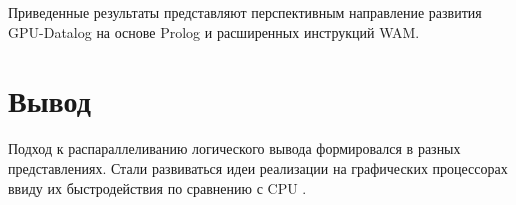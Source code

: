 \begin{figure}[H]
\end{figure} 

Приведенные результаты представляют перспективным направление развития GPU-Datalog на основе Prolog и расширенных инструкций WAM.

\section{Вывод}
Подход к распараллеливанию логического вывода формировался в разных представлениях. Стали развиваться идеи реализации на графических процессорах ввиду их быстродействия по сравнению с CPU \cite{fast_gpu_over_cpu}. 